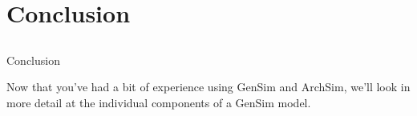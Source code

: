\section{Conclusion}
\subsection{}

\begin{frame}{Conclusion}

Now that you've had a bit of experience using GenSim and ArchSim, we'll
look in more detail at the individual components of a GenSim model.

\end{frame}
